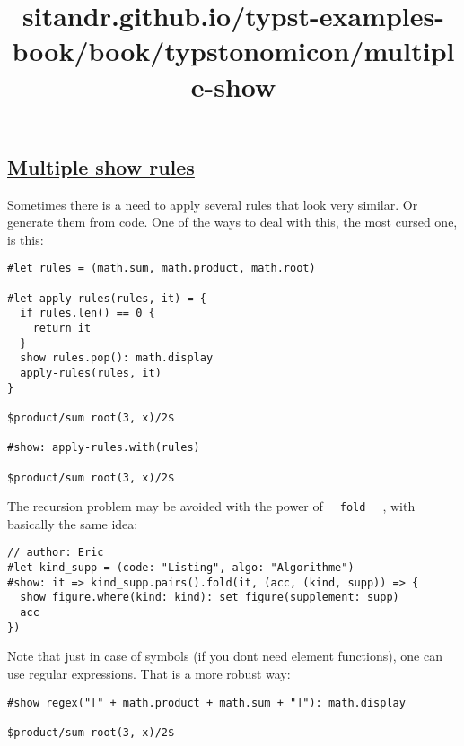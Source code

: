 \title{sitandr.github.io/typst-examples-book/book/typstonomicon/multiple-show}

\subsection{\texorpdfstring{\hyperref[multiple-show-rules]{Multiple show
rules}}{Multiple show rules}}\label{multiple-show-rules}

Sometimes there is a need to apply several rules that look very similar.
Or generate them from code. One of the ways to deal with this, the most
cursed one, is this:

\begin{verbatim}
#let rules = (math.sum, math.product, math.root)

#let apply-rules(rules, it) = {
  if rules.len() == 0 {
    return it
  }
  show rules.pop(): math.display
  apply-rules(rules, it)
}

$product/sum root(3, x)/2$

#show: apply-rules.with(rules)

$product/sum root(3, x)/2$
\end{verbatim}

\pandocbounded{}

The recursion problem may be avoided with the power of
\texttt{\ }{\texttt{\ fold\ }}\texttt{\ } , with basically the same
idea:

\begin{verbatim}
// author: Eric
#let kind_supp = (code: "Listing", algo: "Algorithme")
#show: it => kind_supp.pairs().fold(it, (acc, (kind, supp)) => {
  show figure.where(kind: kind): set figure(supplement: supp)
  acc
})
\end{verbatim}

\pandocbounded{}

Note that just in case of symbols (if you don\textquotesingle t need
element functions), one can use regular expressions. That is a more
robust way:

\begin{verbatim}
#show regex("[" + math.product + math.sum + "]"): math.display

$product/sum root(3, x)/2$
\end{verbatim}

\pandocbounded{}
